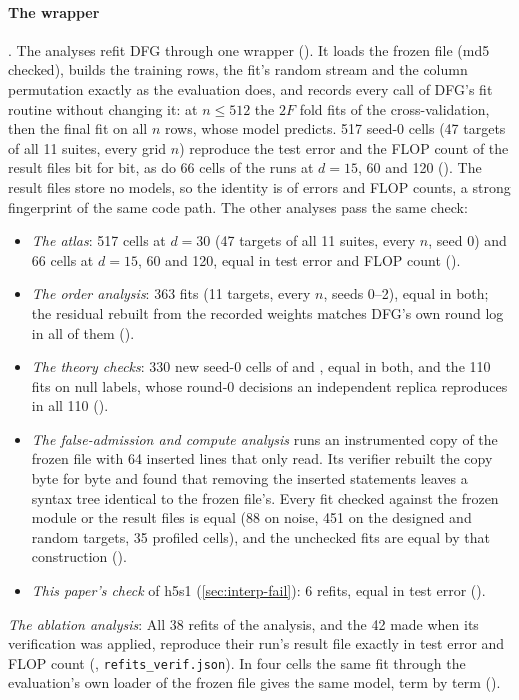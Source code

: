 \paragraph{The wrapper} . The analyses refit DFG through one wrapper (). It loads the frozen file (md5 checked), builds the training rows, the fit's random stream and the column permutation exactly as the evaluation does, and records every call of DFG's fit routine without changing it: at $n\le512$ the $2F$ fold fits of the cross-validation, then the final fit on all $n$ rows, whose model predicts. 517 seed-0 cells (47 targets of all 11 suites, every grid $n$) reproduce the test error and the FLOP count of the result files bit for bit, as do 66 cells of the runs at $d=15$, 60 and 120 (). The result files store no models, so the identity is of errors and FLOP counts, a strong fingerprint of the same code path. The other analyses pass the same check:
\begin{itemize}
\item \emph{The atlas}: 517 cells at $d=30$ (47 targets of all 11 suites, every $n$, seed 0) and 66 cells at $d=15$, 60 and 120, equal in test error and FLOP count ().
\item \emph{The order analysis}: 363 fits (11  targets, every $n$, seeds 0--2), equal in both; the residual rebuilt from the recorded weights matches DFG's own round log in all of them ().
\item \emph{The theory checks}: 330 new seed-0 cells of  and , equal in both, and the 110 fits on null labels, whose round-0 decisions an independent replica reproduces in all 110 ().
\item \emph{The false-admission and compute analysis} runs an instrumented copy of the frozen file with 64 inserted lines that only read. Its verifier rebuilt the copy byte for byte and found that removing the inserted statements leaves a syntax tree identical to the frozen file's. Every fit checked against the frozen module or the result files is equal (88 on noise, 451 on the designed and random targets, 35 profiled cells), and the unchecked fits are equal by that construction ().
\item \emph{This paper's check} of h5s1 (\cref{sec:interp-fail}): 6 refits, equal in test error ().
\end{itemize}
\emph{The ablation analysis}: All 38 refits of the analysis, and the 42 made when its verification was applied, reproduce their run's result file exactly in test error and FLOP count (, \texttt{refits\_verif.json}). In four cells the same fit through the evaluation's own loader of the frozen file gives the same model, term by term ().

